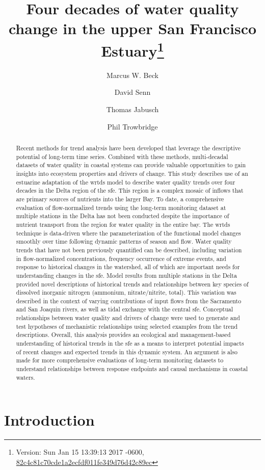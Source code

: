 \documentclass[journal = esthag, manuscript = article]{achemso}\usepackage[]{graphicx}\usepackage[]{color}
\author{Marcus W. Beck}
\affiliation{USEPA National Health and Environmental Effects Research Laboratory, Gulf Ecology Division, Gulf Breeze, FL}
\author{David Senn}
\author{Thomas Jabusch}
\author{Phil Trowbridge}
\affiliation{San Francisco Estuary Institute, Richmond, CA}
\title[Water quality change in the upper SFE]{Four decades of water quality change in the upper San Francisco Estuary\footnote{Version: Sun Jan 15 13:39:13 2017 -0600, \href{https://github.com/fawda123/sftrends_manu/commit/82c4c81c70cde1a2ecfdf011fe349d76d42c89ec}{82c4c81c70cde1a2ecfdf011fe349d76d42c89ec}}}
\begin{document}
\linenumbers

\begin{abstract}
\noindent Recent methods for trend analysis have been developed that leverage the descriptive potential of long-term time series.  Combined with these methods, multi-decadal datasets of water quality in coastal systems can provide valuable opportunities to gain insights into ecosystem properties and drivers of change.  This study describes use of an estuarine adaptation of the \ac{wrtds} model to describe water quality trends over four decades in the Delta region of the \ac{sfe}. This region is a complex mosaic of inflows that are primary sources of nutrients into the larger Bay.  To date, a comprehensive evaluation of flow-normalized trends using the long-term monitoring dataset at multiple stations in the Delta has not been conducted despite the importance of nutrient transport from the region for water quality in the entire bay.  The \ac{wrtds} technique is data-driven where the parameterization of the functional model changes smoothly over time following dynamic patterns of season and flow.  Water quality trends that have not been previously quantified can be described, including variation in flow-normalized concentrations, frequency occurrence of extreme events, and response to historical changes in the watershed, all of which are important needs for understanding changes in the \ac{sfe}.  Model results from multiple stations in the Delta provided novel descriptions of historical trends and relationships between key species of dissolved inorganic nitrogen (ammonium, nitrate/nitrite, total).  This variation was described in the context of varying contributions of input flows from the Sacramento and San Joaquin rivers, as well as tidal exchange with the central \ac{sfe}.  Conceptual relationships between water quality and drivers of change were used to generate and test hypotheses of mechanistic relationships using selected examples from the trend descriptions. Overall, this analysis provides an ecological and management-based understanding of historical trends in the \ac{sfe} as a means to interpret potential impacts of recent changes and expected trends in this dynamic system.  An argument is also made for more comprehensive evaluations of long-term monitoring datasets to understand relationships between response endpoints and causal mechanisms in coastal waters.
\end{abstract}
\acresetall

\section{Introduction}
\end{document}
